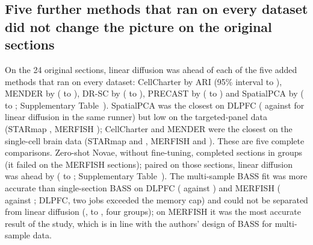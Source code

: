 \documentclass[unnumsec,webpdf,contemporary,large]{oup-authoring-template}
\begin{document}
\subsection{Five further methods that ran on every dataset did not change the picture on the original sections}
On the 24 original sections, linear diffusion was ahead of each of the five added methods that ran on every dataset: CellCharter by
\rvCellCharterD{} ARI (95\% interval \rvCellCharterLo{} to \rvCellCharterHi), MENDER by \rvMENDERD{} (\rvMENDERLo{} to \rvMENDERHi),
DR-SC by \rvDRSCD{} (\rvDRSCLo{} to \rvDRSCHi), PRECAST by \rvPRECASTD{} (\rvPRECASTLo{} to \rvPRECASTHi) and SpatialPCA by
\rvSpatialPCAD{} (\rvSpatialPCALo{} to \rvSpatialPCAHi; Supplementary Table~\STextra). SpatialPCA was the closest on DLPFC
(\rvSpatialPCADlpfc{} against \rvLinDlpfc{} for linear diffusion in the same runner) but low on the targeted-panel data (STARmap
\rvSpatialPCAStarmap, MERFISH \rvSpatialPCAMerfish); CellCharter and MENDER were the closest on the single-cell brain data (STARmap
\rvCellCharterStarmap{} and \rvMENDERStarmap, MERFISH \rvCellCharterMerfish{} and \rvMENDERMerfish). These are five complete comparisons. Zero-shot Novae,
without fine-tuning, completed \vsNovaeN{} sections in \vsNovaeG{} groups (it failed on the MERFISH sections); paired on those sections, linear
diffusion was ahead by \vsNovaeD{} (\vsNovaeLo{} to \vsNovaeHi; Supplementary Table~\STextra). The multi-sample BASS fit was more accurate than
single-section BASS on DLPFC (\rvMfiveDlpfcMulti{} against \rvMfiveDlpfcSingle) and MERFISH (\rvMfiveMerfishMulti{} against
\rvMfiveMerfishSingle; DLPFC, two jobs exceeded the memory cap) and could not be separated from linear diffusion (\rvBassMultiD,
\rvBassMultiLo{} to \rvBassMultiHi, four groups); on MERFISH it was the most accurate result of the study, which is in line with the authors'
design of BASS for multi-sample data.
\end{document}
